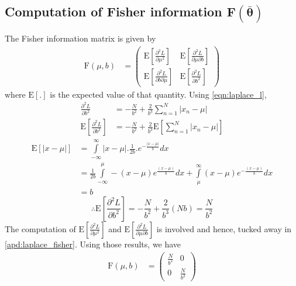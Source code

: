 \documentclass[wcp]{jmlr}
\begin{document}
\subsection*{Computation of Fisher information $\mathbf{F(\bar{\boldsymbol{\theta}})}$}
The Fisher information matrix is given by
\begin{align*}
  \mathrm{F}(\mu,b) &= \left( \begin{array}{cc}
  \mathrm{E} \left[\frac{\partial^2 L}{\partial \mu^2}\right] & \mathrm{E} \left[\frac{\partial^2 L}{\partial\mu \partial b}\right] \\
  \mathrm{E} \left[\frac{\partial^2 L}{\partial b \partial\mu}\right] & \mathrm{E} \left[\frac{\partial^2 L}{\partial b^2}\right] 
  \end{array} \right) 
\end{align*}
where $\mathrm{E}[.]$ is the expected value of that quantity. Using \eqref{eqn:laplace_l},
\begin{align*}
 \frac{\partial^2 L}{\partial b^2} &= -\frac{N}{b^2} + \frac{2}{b^3} \sum_{n=1}^N |x_n-\mu| \\
 \mathrm{E} \left[\frac{\partial^2 L}{\partial b^2}\right] &= -\frac{N}{b^2} + \frac{2}{b^3} \mathrm{E}\left[\sum_{n=1}^N |x_n-\mu|\right]
\end{align*}
\begin{align*}
 \mathrm{E}\left[|x-\mu|\right] &= \int\limits_{-\infty}^{\infty} |x-\mu| . \frac{1}{2b} . e^{-\frac{|x-\mu|}{b}} dx \\
 &= \frac{1}{2b} \int\limits_{-\infty}^{\mu} -(x-\mu) e^{\frac{(x-\mu)}{b}} dx + \int\limits_{\mu}^{\infty} (x-\mu)e^{-\frac{(x-\mu)}{b}} dx \\
 &= b
\end{align*}
\begin{equation*}
 \therefore \mathrm{E} \left[\frac{\partial^2 L}{\partial b^2}\right] = -\frac{N}{b^2} + \frac{2}{b^3} (Nb) = \frac{N}{b^2} 
\end{equation*}
The computation of $\mathrm{E}\left[\frac{\partial^2 L}{\partial \mu^2}\right]$ and 
$\mathrm{E}\left[\frac{\partial^2 L}{\partial \mu \partial b}\right]$ is involved and hence,
tucked away in \autoref{apd:laplace_fisher}. Using those results, we have
\begin{align*}
  \mathrm{F}(\mu,b) &= \left( \begin{array}{cc}
        \frac{N}{b^2} & 0 \\
        0 & \frac{N}{b^2}
            \end{array} \right) 
\end{align*}
\end{document}
